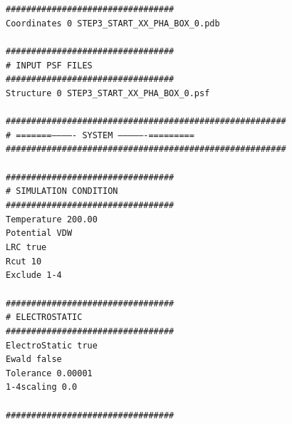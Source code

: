 \texttt{\#\#\#\#\#\#\#\#\#\#\#\#\#\#\#\#\#\#\#\#\#\#\#\#\#\#\#\#\#\#\#\#\#}\\
\texttt{Coordinates 0    STEP3\_START\_XX\_PHA\_BOX\_0.pdb}\\
\texttt{}\\
\texttt{\#\#\#\#\#\#\#\#\#\#\#\#\#\#\#\#\#\#\#\#\#\#\#\#\#\#\#\#\#\#\#\#\#}\\
\texttt{\# INPUT PSF FILES}\\
\texttt{\#\#\#\#\#\#\#\#\#\#\#\#\#\#\#\#\#\#\#\#\#\#\#\#\#\#\#\#\#\#\#\#\#}\\
\texttt{Structure 0  	 STEP3\_START\_XX\_PHA\_BOX\_0.psf}\\
\texttt{}\\
\texttt{\#\#\#\#\#\#\#\#\#\#\#\#\#\#\#\#\#\#\#\#\#\#\#\#\#\#\#\#\#\#\#\#\#\#\#\#\#\#\#\#\#\#\#\#\#\#\#\#\#\#\#\#\#\#\#}\\
\texttt{\#  =======------------- SYSTEM ----------------=========}\\
\texttt{\#\#\#\#\#\#\#\#\#\#\#\#\#\#\#\#\#\#\#\#\#\#\#\#\#\#\#\#\#\#\#\#\#\#\#\#\#\#\#\#\#\#\#\#\#\#\#\#\#\#\#\#\#\#\#}\\
\texttt{}\\
\texttt{\#\#\#\#\#\#\#\#\#\#\#\#\#\#\#\#\#\#\#\#\#\#\#\#\#\#\#\#\#\#\#\#\#}\\
\texttt{\# SIMULATION CONDITION}\\
\texttt{\#\#\#\#\#\#\#\#\#\#\#\#\#\#\#\#\#\#\#\#\#\#\#\#\#\#\#\#\#\#\#\#\#}\\
\texttt{Temperature     200.00}\\
\texttt{Potential       VDW}\\
\texttt{LRC		true}\\
\texttt{Rcut		10}\\
\texttt{Exclude 	1-4}\\
\texttt{}\\
\newpage
\texttt{\#\#\#\#\#\#\#\#\#\#\#\#\#\#\#\#\#\#\#\#\#\#\#\#\#\#\#\#\#\#\#\#\#}\\
\texttt{\# ELECTROSTATIC}\\
\texttt{\#\#\#\#\#\#\#\#\#\#\#\#\#\#\#\#\#\#\#\#\#\#\#\#\#\#\#\#\#\#\#\#\#}\\
\texttt{ElectroStatic		        true}\\
\texttt{Ewald				false}\\
\texttt{Tolerance			0.00001}\\
\texttt{1-4scaling			0.0}\\
\texttt{}\\
\texttt{\#\#\#\#\#\#\#\#\#\#\#\#\#\#\#\#\#\#\#\#\#\#\#\#\#\#\#\#\#\#\#\#\#}\\
